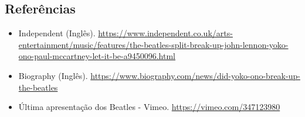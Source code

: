 \hypertarget{referuxeancias-3}{%
\subsection{Referências}\label{referuxeancias-3}}

\begin{itemize}
\tightlist
\item
  \sloppy Independent (Inglês). \url{https://www.independent.co.uk/arts-entertainment/music/features/the-beatles-split-break-up-john-lennon-yoko-ono-paul-mccartney-let-it-be-a9450096.html}
\item
  \sloppy Biography (Inglês). \url{https://www.biography.com/news/did-yoko-ono-break-up-the-beatles}
\item
  \sloppy Última apresentação dos Beatles - Vimeo. \url{https://vimeo.com/347123980}
\end{itemize}
